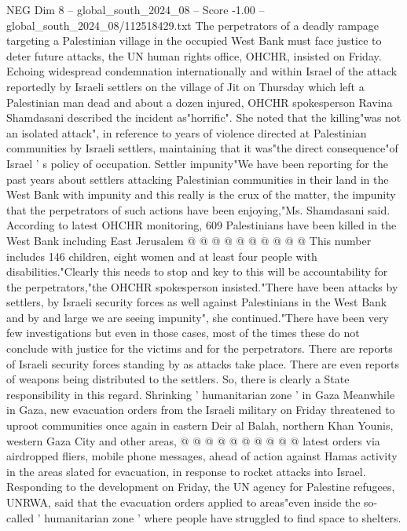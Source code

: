 \begin{textsample}{NEG Dim 8 – global\_south\_2024\_08 – Score -1.00 – global\_south\_2024\_08/112518429.txt}  \label{ex:f8_neg_286}
The perpetrators of a deadly rampage targeting a Palestinian village in the occupied West Bank must face justice to deter future attacks, the UN human rights office, OHCHR, insisted on Friday.
Echoing widespread condemnation internationally and within Israel of the attack reportedly by Israeli settlers on the village of Jit on Thursday which left a Palestinian man dead and about a dozen injured, OHCHR spokesperson Ravina Shamdasani described the incident as"horrific".
She noted that the killing"was not an isolated attack", in reference to years of violence directed at Palestinian communities by Israeli settlers, maintaining that it was"the direct consequence"of Israel ' s policy of occupation.
Settler impunity"We have been reporting for the past years about settlers attacking Palestinian communities in their land in the West Bank with impunity and this really is the crux of the matter, the impunity that the perpetrators of such actions have been enjoying,"Ms.
Shamdasani said.
According to latest OHCHR monitoring, 609 Palestinians have been killed in the West Bank including East Jerusalem @ @ @ @ @ @ @ @ @ @ This number includes 146 children, eight women and at least four people with disabilities."Clearly this needs to stop and key to this will be accountability for the perpetrators,"the OHCHR spokesperson insisted."There have been attacks by settlers, by Israeli security forces as well against Palestinians in the West Bank and by and large we are seeing impunity", she continued."There have been very few investigations but even in those cases, most of the times these do not conclude with justice for the victims and for the perpetrators.
There are reports of Israeli security forces standing by as attacks take place.
There are even reports of weapons being distributed to the settlers.
So, there is clearly a State responsibility in this regard.
Shrinking ' humanitarian zone ' in Gaza Meanwhile in Gaza, new evacuation orders from the Israeli military on Friday threatened to uproot communities once again in eastern Deir al Balah, northern Khan Younis, western Gaza City and other areas, @ @ @ @ @ @ @ @ @ @ latest orders via airdropped fliers, mobile phone messages, ahead of action against Hamas activity in the areas slated for evacuation, in response to rocket attacks into Israel.
Responding to the development on Friday, the UN agency for Palestine refugees, UNRWA, said that the evacuation orders applied to areas"even inside the so-called ' humanitarian zone ' where people have struggled to find space to shelters.

\end{textsample}
